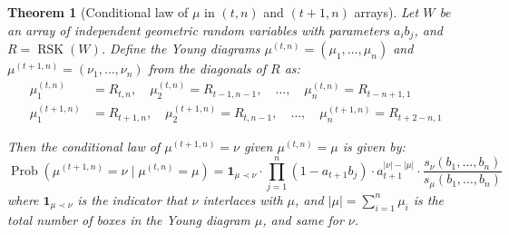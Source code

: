 \documentclass[letterpaper,11pt,oneside,reqno]{book}
\numberwithin{equation}{chapter}  %
\newtheorem{theorem}[proposition]{Theorem}
\theoremstyle{definition}
\begin{document}
\begin{theorem}[Conditional law of $\mu$ in $(t,n)$ and $(t+1,n)$ arrays]
\label{lecture14:thm:conditional_law_mu}
Let $W$ be an array of independent geometric random variables with parameters $a_i b_j$, and $R=\operatorname{RSK}(W)$. Define the Young diagrams $\mu^{(t,n)}=(\mu_1,\ldots,\mu_n)$ and $\mu^{(t+1,n)}=(\nu_1,\ldots,\nu_n)$ from the diagonals of $R$ as:
\begin{align*}
\mu_1^{(t,n)} &= R_{t,n}, \quad \mu_2^{(t,n)} = R_{t-1,n-1}, \quad \ldots, \quad \mu_n^{(t,n)} = R_{t-n+1,1} \\
\mu_1^{(t+1,n)} &= R_{t+1,n}, \quad \mu_2^{(t+1,n)} = R_{t,n-1}, \quad \ldots, \quad \mu_n^{(t+1,n)} = R_{t+2-n,1}
\end{align*}

Then the conditional law of $\mu^{(t+1,n)} = \nu$ given $\mu^{(t,n)} = \mu$ is given by:
\begin{equation}
\label{lecture14:eq:conditional_law_mu}
\operatorname{Prob}\left( \mu^{(t+1,n)} = \nu \mid \mu^{(t,n)} = \mu \right) = \mathbf{1}_{\mu \prec \nu} \cdot \prod_{j=1}^n (1-a_{t+1}b_j) \cdot a_{t+1}^{|\nu|-|\mu|} \cdot \frac{s_{\nu}(b_1,\ldots,b_n)}{s_\mu(b_1,\ldots,b_n)}
\end{equation}
where $\mathbf{1}_{\mu \prec \nu}$ is the indicator that $\nu$ interlaces with $\mu$, and
$|\mu|=\sum_{i=1}^n \mu_i$ is the total number of boxes in the Young diagram $\mu$,
and same for $\nu$.
\end{theorem}
\end{document}
